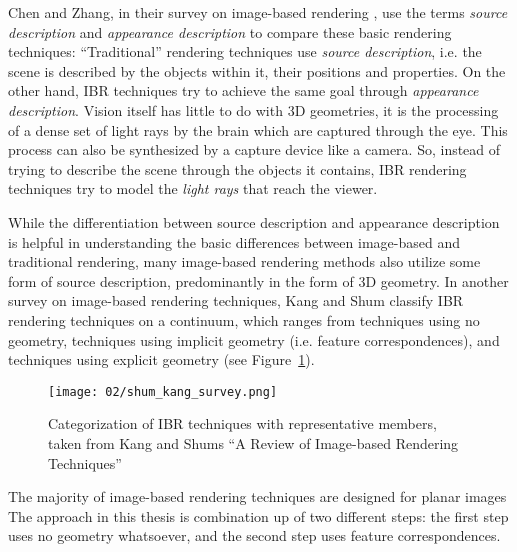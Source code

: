 Chen and Zhang, in their survey on image-based rendering \cite{survey2004}, use the terms \emph{source description} and \emph{appearance description} to compare these basic rendering techniques: ``Traditional'' rendering techniques use \emph{source description}, i.e. the scene is described by the objects within it, their positions and properties. On the other hand, IBR techniques try to achieve the same goal through \emph{appearance description}. Vision itself has little to do with 3D geometries, it is the processing of a dense set of light rays by the brain which are captured through the eye. This process can also be synthesized by a capture device like a camera. So, instead of trying to describe the scene through the objects it contains, IBR rendering techniques try to model the \emph{light rays} that reach the viewer. 

While the differentiation between source description and appearance description is helpful in understanding the basic differences between image-based and traditional rendering, many image-based rendering methods also utilize some form of source description, predominantly in the form of 3D geometry. In another survey on image-based rendering techniques, Kang and Shum \cite{survey2000} classify IBR rendering techniques on a continuum, which ranges from techniques using no geometry, techniques using implicit geometry (i.e. feature correspondences), and techniques using explicit geometry (see Figure~\ref{fig:survey_categorization}).

\begin{figure}
		\centering
		\texttt{[image: 02/shum\_kang\_survey.png]}
    \caption{Categorization of IBR techniques with representative members, taken from Kang and Shums ``A Review of Image-based Rendering Techniques''\cite{survey2000}}
		\label{fig:survey_categorization}
\end{figure}

The majority of image-based rendering techniques are designed for planar images
The approach in this thesis is combination up of two different steps: the first step uses no geometry whatsoever, and the second step uses feature correspondences.

